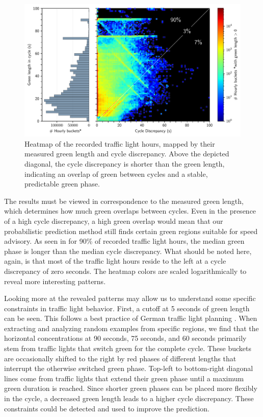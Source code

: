 \begin{figure}[t]
    \centering
    \includegraphics[width=\linewidth]{images/cycle_discrepancy_green_length_heatmap.pdf}
    \caption{Heatmap of the recorded traffic light hours, mapped by their measured green length and cycle discrepancy. Above the depicted diagonal, the cycle discrepancy is shorter than the green length, indicating an overlap of green between cycles and a stable, predictable green phase.}\label{fig:green-length-cycle-discrepancy}
\end{figure}

The results must be viewed in correspondence to the measured green length, which determines how much green overlaps between cycles. Even in the presence of a high cycle discrepancy, a high green overlap would mean that our probabilistic prediction method still finds certain green regions suitable for speed advisory. As seen in  for 90\% of recorded traffic light hours, the median green phase is longer than the median cycle discrepancy. What should be noted here, again, is that most of the traffic light hours reside to the left at a cycle discrepancy of zero seconds. The heatmap colors are scaled logarithmically to reveal more interesting patterns.

Looking more at the revealed patterns may allow us to understand some specific constraints in traffic light behavior. First, a cutoff at 5 seconds of green length can be seen. This follows a best practice of German traffic light planning \cite{TN_libero_mab2}. When extracting and analyzing random examples from specific regions, we find that the horizontal concentrations at 90 seconds, 75 seconds, and 60 seconds primarily stem from traffic lights that switch green for the complete cycle. These buckets are occasionally shifted to the right by red phases of different lengths that interrupt the otherwise switched green phase. Top-left to bottom-right diagonal lines come from traffic lights that extend their green phase until a maximum green duration is reached. Since shorter green phases can be placed more flexibly in the cycle, a decreased green length leads to a higher cycle discrepancy. These constraints could be detected and used to improve the prediction.

